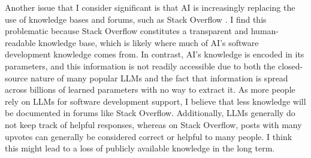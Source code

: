 Another issue that I consider significant is that AI is increasingly replacing the use of knowledge bases and forums, such as Stack Overflow \cite{stackoverflow-decline}.
I find this problematic because Stack Overflow constitutes a transparent and human-readable knowledge base, which is likely where much of AI's software development knowledge comes from.
In contrast, AI's knowledge is encoded in its parameters, and this information is not readily accessible due to both the closed-source nature of many popular LLMs and the fact that information is spread across billions of learned parameters with no way to extract it.
As more people rely on LLMs for software development support, I believe that less knowledge will be documented in forums like Stack Overflow.
Additionally, LLMs generally do not keep track of helpful responses, whereas on Stack Overflow, posts with many upvotes can generally be considered correct or helpful to many people.
I think this might lead to a loss of publicly available knowledge in the long term.
